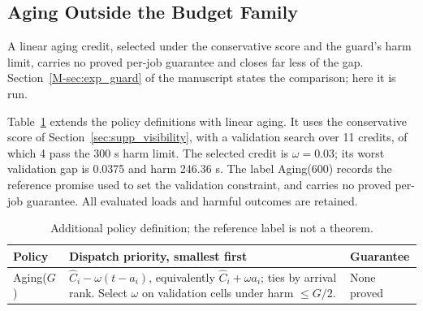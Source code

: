 \documentclass[mathematics,supfile,submit,moreauthors]{Definitions/mdpi}
\newcommand{\devnum}[1]{#1}
\begin{document}
\subsection{Aging Outside the Budget Family}
\label{sec:supp_aging}

A linear aging credit, selected under the conservative score and the guard's harm limit,
carries no proved per-job guarantee and closes far less of the gap.
Section~\ref*{M-sec:exp_guard} of the manuscript states the comparison; here it is run.

Table~\ref{tab:s_aging_policy} extends the policy definitions with linear aging.
It uses the conservative score of Section~\ref{sec:supp_visibility}, with a validation search
over \devnum{11} credits, of which \devnum{4} pass the \devnum{300} s harm limit.
The selected credit is $\omega=\devnum{0.03}$; its worst validation gap is
\devnum{0.0375} and harm \devnum{246.36} s. The label Aging(\devnum{600}) records
the reference promise used to set the validation constraint, and carries no proved
per-job guarantee. All evaluated loads and harmful outcomes are retained.

\begin{table}[htbp]
\centering\small
\caption{Additional policy definition; the reference label is not a theorem.}
\label{tab:s_aging_policy}
\begin{tabular}{lp{}l}
\toprule
Policy & Dispatch priority, smallest first & Guarantee \\
\midrule
Aging($G$) & $\hat C_i-\omega(t-a_i)$, equivalently $\hat C_i+\omega a_i$;
ties by arrival rank. Select $\omega$ on validation cells under harm $\le G/2$. & None proved \\
\bottomrule
\end{tabular}
\end{table}
\end{document}
